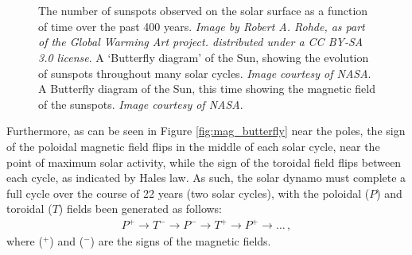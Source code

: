 \documentclass[11pt,a4paper,onecolumn]{report}
\begin{document}
\begin{figure}[t]%
  \centering
  \\%
  \\%
  \caption[]{ The number of sunspots observed on the
  solar surface as a function of time over the past 400 years. \textit{Image by
  Robert A. Rohde, as part of the Global Warming Art project. distributed under
  a CC BY-SA 3.0 license}.  A `Butterfly diagram'
  of the Sun, showing the evolution of sunspots throughout many solar cycles.
  \textit{Image courtesy of NASA}.  A Butterfly
  diagram of the Sun, this time showing the magnetic field of the sunspots.
  \textit{Image courtesy of NASA}. }
\end{figure}

Furthermore, as can be seen in Figure \ref{fig:mag_butterfly} near the poles,
the sign of the poloidal magnetic field flips in the middle of each solar cycle,
near the point of maximum solar activity, while the sign of the toroidal field
flips between each cycle, as indicated by Hales law. As such, the solar dynamo
must complete a full cycle over the course of 22 years (two solar cycles), with the
poloidal (\(P\)) and toroidal (\(T\)) fields been generated as follows:
\begin{align}
  P^+ \rightarrow T^- \rightarrow P^- \rightarrow T^+ \rightarrow P^+ \rightarrow \dotsc\,,
  \label{eqn:dynamo process}
\end{align}
where (\(^+\)) and (\( ^-\)) are the signs of the magnetic fields. \\
\end{document}
